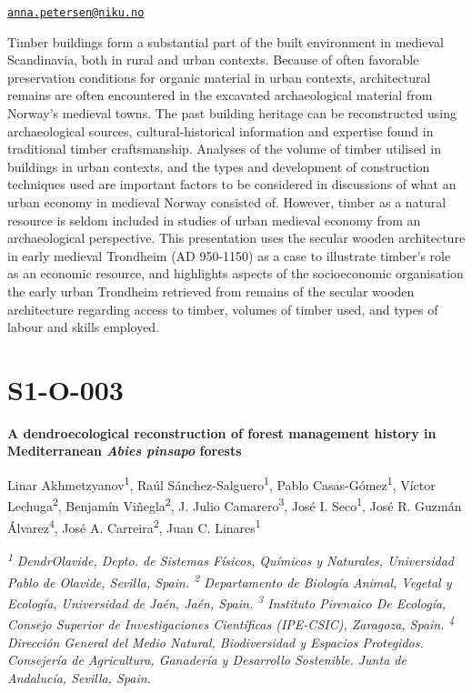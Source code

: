 \documentclass[
]{book}
\begin{document}
\href{mailto:anna.petersen@niku.no}{\nolinkurl{anna.petersen@niku.no}}

Timber buildings form a substantial part of the built environment in medieval Scandinavia, both in rural and urban contexts. Because of often favorable preservation conditions for organic material in urban contexts, architectural remains are often encountered in the excavated archaeological material from Norway's medieval towns. The past building heritage can be reconstructed using archaeological sources, cultural-historical information and expertise found in traditional timber craftsmanship. Analyses of the volume of timber utilised in buildings in urban contexts, and the types and development of construction techniques used are important factors to be considered in discussions of what an urban economy in medieval Norway consisted of. However, timber as a natural resource is seldom included in studies of urban medieval economy from an archaeological perspective. This presentation uses the secular wooden architecture in early medieval Trondheim (AD 950-1150) as a case to illustrate timber's role as an economic resource, and highlights aspects of the socioeconomic organisation the early urban Trondheim retrieved from remains of the secular wooden architecture regarding access to timber, volumes of timber used, and types of labour and skills employed.

\hypertarget{s1-o-003}{%
\section*{S1-O-003}\label{s1-o-003}}

\textbf{A dendroecological reconstruction of forest management history in Mediterranean \emph{Abies pinsapo} forests}

Linar Akhmetzyanov\textsuperscript{1}, Raúl Sánchez-Salguero\textsuperscript{1}, Pablo Casas-Gómez\textsuperscript{1}, Víctor Lechuga\textsuperscript{2}, Benjamín Viñegla\textsuperscript{2}, J. Julio Camarero\textsuperscript{3}, José I. Seco\textsuperscript{1}, José R. Guzmán Álvarez\textsuperscript{4}, José A. Carreira\textsuperscript{2}, Juan C. Linares\textsuperscript{1}

\textsuperscript{\emph{1}} \emph{DendrOlavide, Depto. de Sistemas Físicos, Químicos y Naturales, Universidad Pablo de Olavide, Sevilla, Spain. \textsuperscript{2} Departamento de Biología Animal, Vegetal y Ecología, Universidad de Jaén, Jaén, Spain. \textsuperscript{3} Instituto Pirenaico De Ecología, Consejo Superior de Investigaciones Científicas (IPE-CSIC), Zaragoza, Spain. \textsuperscript{4} Dirección General del Medio Natural, Biodiversidad y Espacios Protegidos. Consejería de Agricultura, Ganadería y Desarrollo Sostenible. Junta de Andalucía, Sevilla, Spain.}
\end{document}

